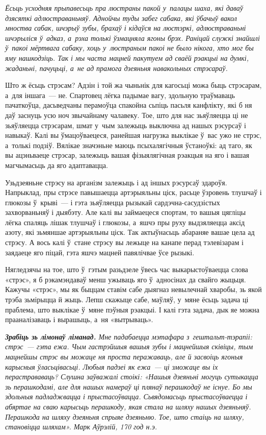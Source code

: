 \emph{Ёсьць усходняя прыпавесьць пра люстраны пакой у~палацы шаха, які даваў дзясяткі адлюстраваньняў. Аднойчы туды забег сабака, які ўбачыў вакол мноства сабак, шчэрыў зубы, брахаў і кідаўся на люстэркі, адлюстраваньні шчэрыліся ў~адказ, а~рэха толькі ўзмацняла ягоны брэх. Раніцай служкі знайшлі ў~пакоі мёртвага сабаку, хоць у~люстраным пакоі не было нікога, хто мог бы яму нашкодзіць. Так і мы часта мацней пакутуем ад сваёй рэакцыі на думкі, жаданьні, пачуцьці, а~не ад прамога дзеяньня навакольных стрэсараў.}


Што ж ёсьць стрэсам? Адзін і той жа чыньнік для кагосьці можа быць стрэсарам, а~для іншага~--- не. Спартовец лёгка падымае вагу, здольную траўмаваць пачаткоўца, дасьведчаны перамоўца спакойна сьпіць пасьля канфлікту, які б ня даў заснуць усю ноч звычайнаму чалавеку. Тое, што для нас зьяўляецца ці не зьяўляецца стрэсарам, шмат у~чым залежыць выключна ад нашых рэсурсаў і навыкаў. Калі вы ўмацоўваецеся, ранейшая нагрузка выклікае ў~вас ужо не стрэс, а~толькі подзіў. Вялікае значэньне маюць псыхалягічныя ўстаноўкі: ад таго, як вы ацэньваеце стрэсар, залежыць вашая фізыялягічная рэакцыя на яго і вашая магчымасьць да яго адаптавацца.

Узьдзеяньне стрэсу на арганізм залежыць і ад іншых рэсурсаў здароўя. Напрыклад, пры стрэсе павышаецца артэрыяльны ціск, расьце ўзровень тлушчаў і глюкозы ў~крыві~--- і гэта зьяўляецца рызыкай сардэчна-сасудзістых захворваньняў і дыябэту. Але калі вы займаецеся спортам, то вашыя цягліцы лёгка спаляць лішак тлушчаў і глюкозы, а~яшчэ пры руху выдзяляецца аксід азоту, які зьмяншае артэрыяльны ціск. Так актыўнасьць абараняе вашае цела ад стрэсу. А вось калі ў~стане стрэсу вы лежыце на канапе перад тэлевізарам і заядаеце яго піцай, гэта яшчэ мацней павялічвае ўсе рызыкі.

Нягледзячы на тое, што ў~гэтым разьдзеле ўвесь час выкарыстоўваецца слова «стрэс», я б рэкамэндаваў менш ужываць яго ў~адносінах да свайго жыцьця. Кажучы «стрэс», мы як быццам ставім сабе дыягназ невылечнай хваробы, зь якой трэба зьмірыцца й жыць. Лепш скажыце сабе, маўляў, у~мяне ёсьць задача ці праблема, што выклікае ў~мяне пэўныя рэакцыі. І калі гэта задача, дык яе можна прааналізаваць і вырашыць, а~ня «вытрываць».

\emph{\textbf{Зрабіць зь лімонаў ліманад.} Мне падабаецца мэтафара з~гештальт-тэрапіі: стрэс~--- гэта ежа. Чым гастрэйшыя вашыя зубы і мацнейшыя сківіцы, тым мацнейшы стрэс вы можаце ня проста перажаваць, але й засвоіць ягоныя карысныя ўласьцівасьці. Любыя падзеі як ежа~--- ці зможаце вы іх перастрававаць? Слушна заўважалі стоікі: «Нашыя дзеяньні могуць сутыкацца зь перашкодамі, але для нашых намераў ці плянаў перашкодаў не існуе. Бо мы здольныя падладжвацца і прыстасоўвацца. Сьвядомасьць прыстасоўваецца і абяртае на сваю карысьць перашкоду, якая стала на шляху нашых дзеяньняў. Перашкода на шляху дзеяньня спрыяе дзеяньню. Тое, што стаіць на шляху, становіцца шляхам». Марк Аўрэлій, 170 год н.э.}

